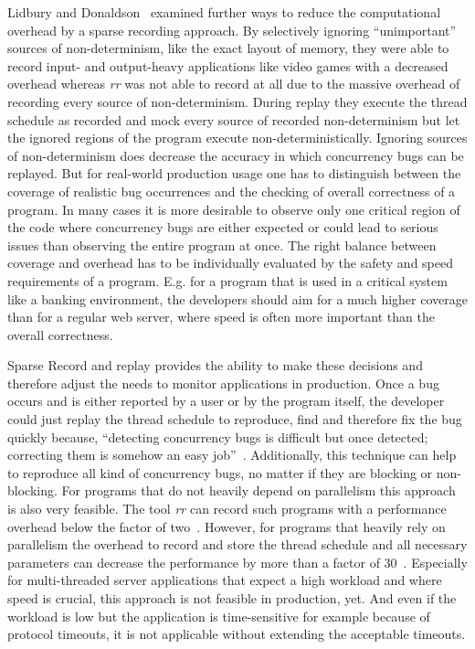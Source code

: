 \documentclass[conference]{IEEEtran}
\begin{document}
Lidbury and Donaldson~\cite{lidbury2019sparse} examined further ways to reduce the computational overhead by a sparse recording approach.
By selectively ignoring ``unimportant'' sources of non-determinism, like the exact layout of memory, they were able to record input- and output-heavy applications like video games with a decreased overhead whereas \emph{rr} was not able to record at all due to the massive overhead of recording every source of non-determinism.
During replay they execute the thread schedule as recorded and mock every source of recorded non-determinism but let the ignored regions of the program execute non-deterministically.
Ignoring sources of non-determinism does decrease the accuracy in which concurrency bugs can be replayed.
But for real-world production usage one has to distinguish between the coverage of realistic bug occurrences and the checking of overall correctness of a program.
In many cases it is more desirable to observe only one critical region of the code where concurrency bugs are either expected or could lead to serious issues than observing the entire program at once.
The right balance between coverage and overhead has to be individually evaluated by the safety and speed requirements of a program.
E.g. for a program that is used in a critical system like a banking environment, the developers should aim for a much higher coverage than for a regular web server, where speed is often more important than the overall correctness.

Sparse Record and replay provides the ability to make these decisions and therefore adjust the needs to monitor applications in production.
Once a bug occurs and is either reported by a user or by the program itself, the developer could just replay the thread schedule to reproduce, find and therefore fix the bug quickly because, ``detecting concurrency bugs is difficult but once detected; correcting them is somehow an easy job''~\cite{tchamgoue2012testing}.
Additionally, this technique can help to reproduce all kind of concurrency bugs, no matter if they are blocking or non-blocking.
For programs that do not heavily depend on parallelism this approach is also very feasible.
The tool \emph{rr} can record such programs with a performance overhead below the factor of two~\cite{o2017engineering}.
However, for programs that heavily rely on parallelism the overhead to record and store the thread schedule and all necessary parameters can decrease the performance by more than a factor of 30~\cite{o2017engineering}.
Especially for multi-threaded server applications that expect a high workload and where speed is crucial, this approach is not feasible in production, yet.
And even if the workload is low but the application is time-sensitive for example because of protocol timeouts, it is not applicable without extending the acceptable timeouts.
\end{document}
